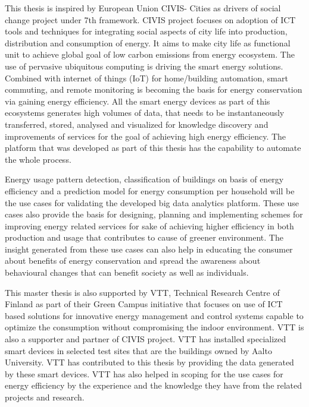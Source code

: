 This thesis is inspired by European Union CIVIS- Cities as drivers of social change project under 7th framework. CIVIS project focuses on adoption of ICT tools and techniques for integrating social aspects of city life into production, distribution and consumption of energy. It aims to make city life as functional unit to achieve global goal of low carbon emissions from energy ecosystem. The use of pervasive ubiquitous computing is driving the smart energy solutions. Combined with internet of things (IoT) for home/building automation, smart commuting, and remote monitoring is becoming the basis for energy conservation via gaining energy efficiency. All the smart energy devices as part of this ecosystems generates high volumes of data, that needs to be instantaneously transferred, stored, analysed and visualized for knowledge discovery and  improvements of services for the goal of achieving high energy efficiency. The platform that was developed as part of this thesis has the capability to automate the whole process.
 
Energy usage pattern detection, classification of buildings on basis of energy efficiency and a prediction model for energy consumption per household will be the use cases for validating the developed big data analytics platform. These use cases also provide the basis for designing, planning and implementing schemes for improving energy related services for sake of achieving higher efficiency in both production and usage that contributes to cause of greener environment. The insight generated from these use cases can also help in educating the consumer about benefits of energy conservation and spread the awareness about behavioural changes that can benefit society as well as individuals. 

This master thesis is also supported by VTT, Technical Research Centre of Finland as part of their Green Campus initiative that focuses on use of ICT based solutions for innovative energy management and control systems capable to optimize the consumption without compromising the indoor environment. VTT is also a supporter and partner of CIVIS project. VTT has installed specialized smart devices in selected test sites that are the buildings owned by Aalto University. VTT has contributed to this thesis by providing the data generated by these smart devices. VTT has also helped in scoping for the use cases for energy efficiency by the experience and the knowledge they have from the related projects and research.

